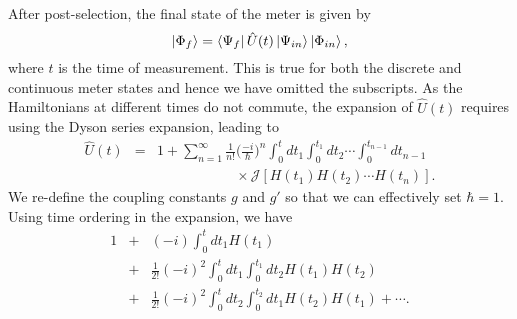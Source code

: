 \documentclass[aps,pra,showpacs,twoside,twocolumn,10pt]{revtex4-1}
\newcommand{\stkout}[1]{\ifmmode\text{\sout{\ensuremath{#1}}}\else\sout{#1}\fi}
\begin{document}
After post-selection, the final state of the meter is given by
\begin{equation}
  \ket{\Phi_f}=\bra{\Psi_f}\hat{U}(t)\ket{\Psi_{in}}\ket{\Phi_{in}},
\end{equation}
where $t$ is the time of measurement. This is true for both the discrete and continuous meter states and hence we have omitted the subscripts. As the Hamiltonians at different times do not commute, the expansion of $\hat{U}(t)$ requires using the Dyson series expansion, leading to %
\begin{eqnarray}
\label{eq:uni}
    \hat{U}(t)
    &=& 1+ \sum_{n=1}^{\infty} \frac{1}{n!}\Big (\frac{-i}{\hbar}\Big)^n \int_{0}^{t}dt_1 \int_{0}^{t_1}dt_2 \cdots \int_{0}^{t_{n-1}}dt_{n-1}\nonumber\\ &&\phantom{ dure cholo jai}
\times    \mathcal{J}[H(t_1)H(t_2) \cdots H(t_n)].
\end{eqnarray}
We re-define the coupling constants \(g\) and \(g'\) so that we can effectively set 
$\hbar=1$. Using time ordering %
in the expansion,
we have
\begin{eqnarray}
 1&+& (-i) \int_{0}^{t}dt_1 H(t_1)\nonumber\\
&+&\frac{1}{2!}(-i)^2 \int_{0}^{t}dt_1 \int_{0}^{t_1}dt_2 H(t_1)H(t_2)\nonumber\\
 &+&\frac{1}{2!}(-i)^2 \int_{0}^{t}dt_2 \int_{0}^{t_2}dt_1 H(t_2)H(t_1)+ \cdots.
\end{eqnarray}
\end{document}
